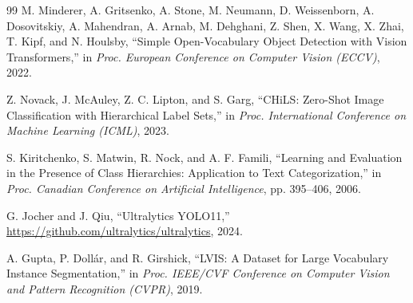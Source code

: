\begin{thebibliography}{99}
    M. Minderer, A. Gritsenko, A. Stone, M. Neumann, D. Weissenborn, A. Dosovitskiy, A. Mahendran, A. Arnab, M. Dehghani, Z. Shen, X. Wang, X. Zhai, T. Kipf, and N. Houlsby,
    ``Simple Open-Vocabulary Object Detection with Vision Transformers,''
    in {\it Proc. European Conference on Computer Vision (ECCV)}, 2022.

    Z. Novack, J. McAuley, Z. C. Lipton, and S. Garg,
    ``CHiLS: Zero-Shot Image Classification with Hierarchical Label Sets,''
    in {\it Proc. International Conference on Machine Learning (ICML)}, 2023.

    S. Kiritchenko, S. Matwin, R. Nock, and A. F. Famili,
    ``Learning and Evaluation in the Presence of Class Hierarchies: Application to Text Categorization,''
    in {\it Proc. Canadian Conference on Artificial Intelligence}, pp. 395--406, 2006.

    G. Jocher and J. Qiu,
    ``Ultralytics YOLO11,''
    \url{https://github.com/ultralytics/ultralytics}, 2024.

    A. Gupta, P. Doll\'{a}r, and R. Girshick,
    ``LVIS: A Dataset for Large Vocabulary Instance Segmentation,''
    in {\it Proc. IEEE/CVF Conference on Computer Vision and Pattern Recognition (CVPR)}, 2019.

\end{thebibliography}
